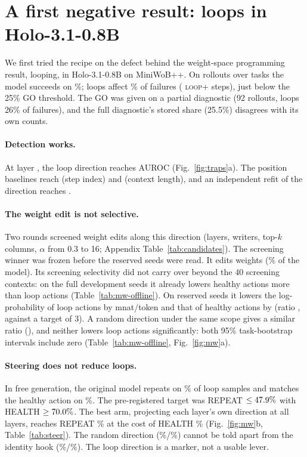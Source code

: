 \section{A first negative result: loops in Holo-3.1-0.8B}
\label{sec:mw}
We first tried the recipe on the defect behind the weight-space programming result, looping, in Holo-3.1-0.8B on MiniWoB++. On \mwNNormal{} rollouts over \mwNTasks{} tasks the model succeeds on \mwSuccessPct\%; loops affect \mwLoopSharePct\% of failures (\mwLoopPos{} \textsc{loop+} steps), just below the 25\% GO threshold. The GO was given on a partial diagnostic (92 rollouts, loops 26\% of failures), and the full diagnostic's stored share (25.5\%) disagrees with its own counts. %

\paragraph{Detection works.} At layer \mwAucBestLayer, the loop direction reaches AUROC \mwAucBestExact{} (Fig.~\ref{fig:traps}a). The position baselines reach \mwAucStep{} (step index) and \mwAucCtx{} (context length), and an independent refit of the direction reaches \mwAstraAuc.

\paragraph{The weight edit is not selective.} Two rounds screened \mwOffNCand{} weight edits along this direction (layers, writers, top-$k$ columns, $\alpha$ from 0.3 to 16; Appendix Table~\ref{tab:candidates}). The screening winner was frozen before the reserved seeds were read. It edits \mwPatchChanged{} weights (\mwPatchPct\% of the model). Its screening selectivity did not carry over beyond the 40 screening contexts: on the full development seeds it already lowers healthy actions more than loop actions (Table~\ref{tab:mw-offline}). On reserved seeds it lowers the log-probability of loop actions by \mwFinLoopDec{} mnat/token and that of healthy actions by \mwFinHealthyDec{} (ratio \mwFinRatio, against a target of 3). A random direction under the same scope gives a similar ratio (\mwFinRatioRand), and neither lowers loop actions significantly: both 95\% task-bootstrap intervals include zero (Table~\ref{tab:mw-offline}, Fig.~\ref{fig:mw}a).

\paragraph{Steering does not reduce loops.} In free generation, the original model repeats on \mwStBaseRepeat\% of loop samples and matches the healthy action on \mwStBaseHealth\%. The pre-registered target was REPEAT $\le47.9\%$ with HEALTH $\ge70.0\%$. The best arm, projecting each layer's own direction at all layers, reaches REPEAT \mwStNativeRepeat\% at the cost of HEALTH \mwStNativeHealth\% (Fig.~\ref{fig:mw}b, Table~\ref{tab:steer}). The random direction (\mwStRandRepeat\%/\mwStRandHealth\%) cannot be told apart from the identity hook (\mwStIdentRepeat\%/\mwStIdentHealth\%). The loop direction is a marker, not a usable lever.

